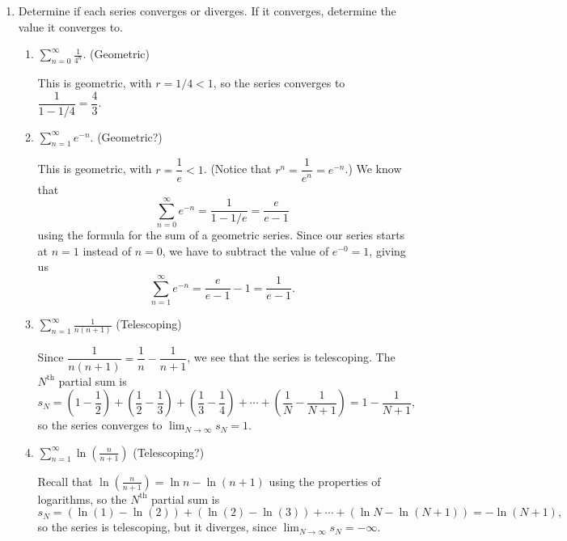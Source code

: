 \documentclass[12pt]{article}
\newcommand{\di}{\displaystyle}
\begin{document}
\begin{enumerate}
 \item Determine if each series converges or diverges. If it converges, determine the value it converges to.

\begin{enumerate}
 \item $\di \sum_{n=0}^\infty \frac{1}{4^n}$. (Geometric)
 
 \bigskip
 
 This is geometric, with $r=1/4<1$, so the series converges to $\dfrac{1}{1-1/4} = \dfrac{4}{3}$.
 
 \item $\di \sum_{n=1}^\infty e^{-n}$. (Geometric?)

 \bigskip
 
 This is geometric, with $r = \dfrac{1}{e}<1$. (Notice that $r^n = \dfrac{1}{e^n} = e^{-n}$.) We know that 
\[
\sum_{n=0}^\infty e^{-n} = \dfrac{1}{1-1/e} = \dfrac{e}{e-1}
\]
using the formula for the sum of a geometric series. Since our series starts at $n=1$ instead of $n=0$, we have to subtract the value of $e^{-0} = 1$, giving us
\[
 \sum_{n=1}^\infty e^{-n} = \dfrac{e}{e-1}-1 = \dfrac{1}{e-1}.
\]

 
 \item $\di \sum_{n=1}^\infty \frac{1}{n(n+1)}$ (Telescoping)

\bigskip

Since $\dfrac{1}{n(n+1)} = \dfrac{1}{n}-\dfrac{1}{n+1}$, we see that the series is telescoping. The $N^{\textrm{th}}$ partial sum is
\[
s_N =  \left(1-\frac{1}{2}\right)+\left(\frac{1}{2}-\frac{1}{3}\right)+\left(\frac{1}{3}-\frac{1}{4}\right)+\cdots + \left(\frac{1}{N}-\frac{1}{N+1}\right) = 1-\frac{1}{N+1},
\]
so the series converges to $\di\lim_{N\to\infty}s_N = 1$.

 \item $\di \sum_{n=1}^\infty \ln\left(\frac{n}{n+1}\right)$ (Telescoping?)

Recall that $\ln\left(\frac{n}{n+1}\right) =\ln n - \ln (n+1)$ using the properties of logarithms, so the $N^{\textrm{th}}$ partial sum is
\[
s_N = (\ln(1)-\ln(2))+(\ln(2)-\ln(3))+\cdots + (\ln N-\ln (N+1)) = -\ln(N+1),
\]
so the series is telescoping, but it diverges, since $\di\lim_{N\to\infty}s_N = -\infty$.

\end{enumerate}


\end{enumerate}
\end{document}
